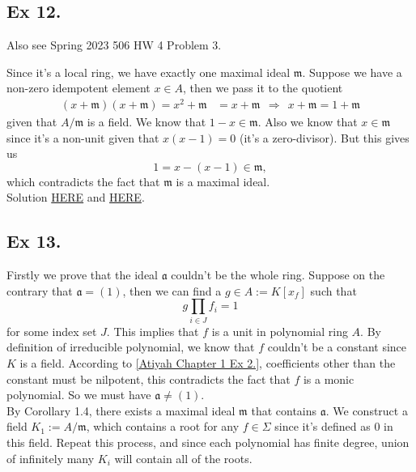 \subsection{Ex 12.}

\vspace{0.2in}Also see Spring 2023 506 HW 4 Problem 3.\vspace{0.2in}

Since it's a local ring, we have exactly one maximal ideal $\mathfrak m$. Suppose we have a non-zero idempotent element $x\in A$, then we pass it to the quotient
\begin{align*}
    (x+\mathfrak m)(x+\mathfrak m)=x^2+\mathfrak m&=x+\mathfrak m
    ~~\Rightarrow~~ x+\mathfrak m=1+\mathfrak m
\end{align*} given that $A/\mathfrak m$ is a field. We know that $1-x\in \mathfrak m$. Also we know that $x\in\mathfrak m$ since it's a non-unit given that $x(x-1)=0$ (it's a zero-divisor). But this gives us 
$$1=x-(x-1)\in \mathfrak m,$$ which contradicts the fact that $\mathfrak m$ is a maximal ideal.\\

Solution \href{https://math.stackexchange.com/questions/3180861/proof-check-idempotents-of-a-local-commutative-ring}{HERE} and \href{https://math.stackexchange.com/questions/725171/idempotents-in-a-local-ring}{HERE}.



\subsection{Ex 13.}

\indent Firstly we prove that the ideal $\mathfrak a$ couldn't be the whole ring. Suppose on the contrary that $\mathfrak a=(1)$, then we can find a $g\in A:=K[x_f]$ such that 
$$g\prod_{i\in J}f_i=1$$ for some index set $J$. This implies that $f$ is a unit in polynomial ring $A$. By definition of irreducible polynomial, we know that $f$ couldn't be a constant since $K$ is a field. According to \ref{Atiyah Chapter 1 Ex 2.}, coefficients other than the constant must be nilpotent, this contradicts the fact that $f$ is a monic polynomial. So we must have $\mathfrak a\neq (1)$.\\

By Corollary 1.4, there exists a maximal ideal $\mathfrak m$ that contains $\mathfrak a$. We construct a field $K_1:=A/\mathfrak m$, which contains a root for any $f\in \Sigma$ since it's defined as $0$ in this field. Repeat this process, and since each polynomial has finite degree, union of infinitely many $K_i$ will contain all of the roots. 

